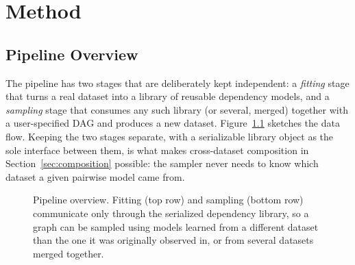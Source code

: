 \documentclass[
  english,
  class=report,
  accentcolor=2c,
  marginpar=false,
  parskip=half-,
  fontsize=11pt,
  ruledheaders=false,
  pdfa=false,
  IMRAD=false,
  thesis={type=master}
]{tudapub}
\begin{document}
\chapter{Method}
\label{chap:method}

\section{Pipeline Overview}
The pipeline has two stages that are deliberately kept independent: a
\emph{fitting} stage that turns a real dataset into a library of reusable
dependency models, and a \emph{sampling} stage that consumes any such
library (or several, merged) together with a user-specified DAG and produces
a new dataset. Figure~\ref{fig:pipeline} sketches the data flow. Keeping the
two stages separate, with a serializable library object as the sole
interface between them, is what makes cross-dataset composition in
Section~\ref{sec:composition} possible: the sampler never needs to know
which dataset a given pairwise model came from.

\begin{figure}[ht]
\centering
{}
\caption{Pipeline overview. Fitting (top row) and sampling (bottom row)
communicate only through the serialized dependency library, so a graph can
be sampled using models learned from a different dataset than the one it
was originally observed in, or from several datasets merged together.}
\label{fig:pipeline}
\end{figure}
\end{document}
